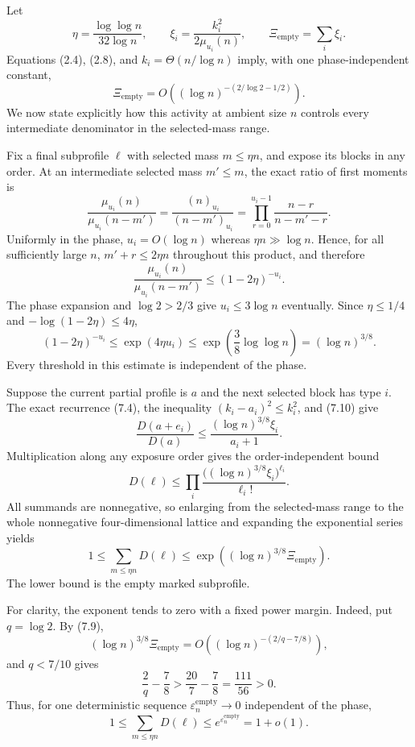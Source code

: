 

Let
\[
  \eta=\frac{\log\log n}{32\log n},
  \qquad
  \xi_i=\frac{k_i^2}{2\mu_{u_i}(n)},
  \qquad
  \Xi_{\mathrm{empty}}=\sum_i\xi_i.
  \tag{7.8}
\]
Equations (2.4), (2.8), and
$k_i=\Theta(n/\log n)$ imply, with one phase-independent constant,
\begin{equation*}
  \Xi_{\mathrm{empty}}
  =O\!\left((\log n)^{-(2/\log 2-1/2)}\right).
  \tag{7.9}
\end{equation*}
We now state explicitly how this activity at ambient size $n$ controls every
intermediate denominator in the selected-mass range.

Fix a final subprofile $\ell$ with selected mass $m\le\eta n$, and expose its
blocks in any order. At an intermediate selected mass $m'\le m$, the exact
ratio of first moments is
\[
  \frac{\mu_{u_i}(n)}{\mu_{u_i}(n-m')}
  =\frac{(n)_{u_i}}{(n-m')_{u_i}}
  =\prod_{r=0}^{u_i-1}
    \frac{n-r}{n-m'-r}.
\]
Uniformly in the phase, $u_i=O(\log n)$ whereas
$\eta n\gg\log n$. Hence, for all sufficiently large $n$,
$m'+r\le2\eta n$ throughout this product, and therefore
\[
  \frac{\mu_{u_i}(n)}{\mu_{u_i}(n-m')}
  \le(1-2\eta)^{-u_i}.
\]
The phase expansion and $\log 2>2/3$ give $u_i\le3\log n$ eventually. Since
$\eta\le1/4$ and $-\log(1-2\eta)\le4\eta$,
\begin{equation*}
  (1-2\eta)^{-u_i}
  \le\exp(4\eta u_i)
  \le\exp\!\left(\frac38\log\log n\right)
  =(\log n)^{3/8}.
  \tag{7.10}
\end{equation*}
Every threshold in this estimate is independent of the phase.

Suppose the current partial profile is $a$ and the next selected block has type
$i$. The exact recurrence (7.4), the inequality
$(k_i-a_i)^2\le k_i^2$, and (7.10) give
\[
  \frac{D(a+e_i)}{D(a)}
  \le
  \frac{(\log n)^{3/8}\xi_i}{a_i+1}.
\]
Multiplication along any exposure order gives the order-independent bound
\[
  D(\ell)
  \le
  \prod_i
  \frac{\bigl((\log n)^{3/8}\xi_i\bigr)^{\ell_i}}
       {\ell_i!}.
\]
All summands are nonnegative, so enlarging from the selected-mass range to the
whole nonnegative four-dimensional lattice and expanding the exponential
series yields
\begin{equation*}
  1
  \le
  \sum_{m\le\eta n}D(\ell)
  \le
  \exp\!\left((\log n)^{3/8}\Xi_{\mathrm{empty}}\right).
  \tag{7.11}
\end{equation*}
The lower bound is the empty marked subprofile.

For clarity, the exponent tends to zero with a fixed power margin. Indeed,
put $q=\log 2$. By (7.9),
\[
  (\log n)^{3/8}\Xi_{\mathrm{empty}}
  =O\!\left((\log n)^{-(2/q-7/8)}\right),
\]
and $q<7/10$ gives
\[
  \frac2q-\frac78
  >\frac{20}{7}-\frac78
  =\frac{111}{56}>0.
\]
Thus, for one deterministic sequence
$\varepsilon_n^{\mathrm{empty}}\to0$ independent of the phase,
\[
  1
  \le
  \sum_{m\le\eta n}D(\ell)
  \le e^{\varepsilon_n^{\mathrm{empty}}}
  =1+o(1).
\]
